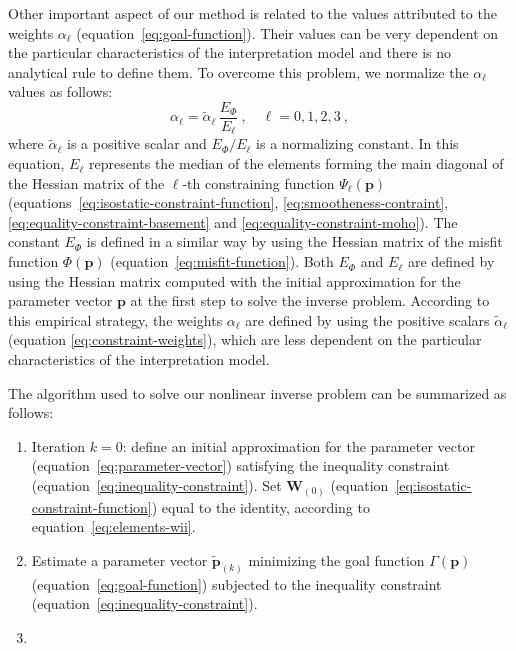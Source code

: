 \documentclass[manuscript]{geophysics}
\begin{document}
Other important aspect of our method is related to the values attributed to 
the weights $\alpha_{\ell}$ (equation~\ref{eq:goal-function}).
Their values can be very dependent on the particular characteristics of the 
interpretation model and there is no analytical rule to define them. 
To overcome this problem, we normalize the $\alpha_{\ell}$ values as follows:
\begin{equation}
\alpha_{\ell} = \tilde{\alpha}_{\ell} \, \frac{E_{\Phi}}{E_{\ell}} \: 
, \quad \ell = 0, 1, 2, 3 \: ,
\label{eq:constraint-weights}
\end{equation}
where $\tilde{\alpha}_{\ell}$ is a positive scalar and $E_{\Phi} / E_{\ell}$
is a normalizing constant. In this equation, $E_{\ell}$ represents the median 
of the elements forming the main diagonal of the Hessian matrix of the 
$\ell$-th constraining function $\Psi_{\ell}(\mathbf{p})$ 
(equations~\ref{eq:isostatic-constraint-function}, 
\ref{eq:smootheness-contraint}, \ref{eq:equality-constraint-basement} and 
\ref{eq:equality-constraint-moho}). The constant $E_{\Phi}$ is defined in 
a similar way by using the Hessian matrix of the misfit function $\Phi(\mathbf{p})$ 
(equation~\ref{eq:misfit-function}). 
Both $E_{\Phi}$ and $E_{\ell}$ are defined by using the Hessian matrix computed with 
the initial approximation for the parameter vector $\mathbf{p}$ at the first 
step to solve the inverse problem.
According to this empirical strategy, the weights $\alpha_{\ell}$ are defined 
by using the positive scalars $\tilde{\alpha}_{\ell}$ 
(equation \ref{eq:constraint-weights}), which are less dependent on the particular 
characteristics of the interpretation model.

The algorithm used to solve our nonlinear inverse problem can be summarized as follows:

\begin{enumerate}
	\item Iteration $k = 0$: define an initial approximation 
	for the parameter vector (equation~\ref{eq:parameter-vector}) satisfying the 
	inequality constraint (equation~\ref{eq:inequality-constraint}). 
	Set $\mathbf{W}_{(0)}$ (equation~\ref{eq:isostatic-constraint-function}) equal to the
	identity, according to equation~\ref{eq:elements-wii}.
	
	\item Estimate a parameter vector $\tilde{\mathbf{p}}_{(k)}$ minimizing the goal function $\Gamma(\mathbf{p})$ (equation~\ref{eq:goal-function})
	subjected to the inequality constraint (equation~\ref{eq:inequality-constraint}).
	
	\item 

\end{enumerate}
\end{document}
